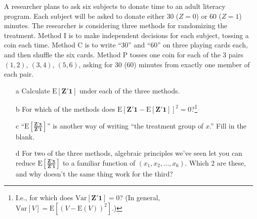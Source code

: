 A researcher plans to ask six subjects to donate time to an adult
literacy program. Each subject will be asked to donate either 30
($Z=0$) or 60 ($Z=1$)
minutes. The researcher is considering three methods for randomizing
the treatment. Method I is to make independent decisions for each
subject, tossing a coin each time. Method C is to
write ``30'' and ``60'' on three playing cards each, and then shuffle
the six cards. Method P tosses one coin for each of the 3 pairs
$(1,2)$, $(3,4)$, $(5,6)$, asking for 30 (60) minutes from exactly one
member of each pair. 

\begin{itemize}
\item[a] Calculate $\mathrm{E}\left[\mathbf{Z}'\mathbf{1}\right]$ under each of the three methods.
\item[b] For which of the methods does $\mathrm{E}
  \left[\mathbf{Z}'\mathbf{1} -\mathrm{E} \left[\mathbf{Z}'\mathbf{1}\right]\right]^{2} =
  0$?\footnote{I.e., for which does
    $\mathrm{Var}\left[\mathbf{Z}'\mathbf{1}\right] = 0$?  (In general,
    $\mathrm{Var}\left[V\right] = \mathrm{E} \left[\left(V - \mathrm{E}(V) \right)^{2}\right] $.)}
\item[c] ``$\mathrm{E} \left[\frac{\mathbf{Z}'\mathbf{x}}{\mathbf{Z}'\mathbf{1}}\right]$''
  is another way of writing ``the treatment group
  \underline{\hspace{3em}} of $x$.''  Fill in the blank.
\item[d] For two of the three methods, algebraic principles we've seen
  let you can reduce
  $\mathrm{E} \left[\frac{\mathbf{Z}'\mathbf{x}}{\mathbf{Z}'\mathbf{1}}\right]$ to a
  familiar function of $(x_{1}, x_{2}, \ldots, x_{6}) $.  Which 2 are
  these, and why doesn't the same thing work for the third?
\end{itemize}
